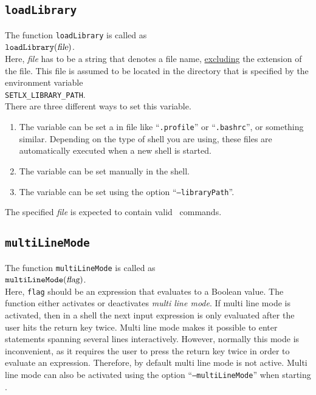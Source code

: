 \subsection{\texttt{loadLibrary}}
The function \texttt{loadLibrary}  is called as
\\[0.2cm]
\hspace*{1.3cm}
$\mathtt{loadLibrary}(\textsl{file})$.
\\[0.2cm]
Here, \textsl{file} has to be a string that denotes a file name, \underline{excludin}g the extension
of the file.  This file is assumed to be located in the directory that is specified by the
environment variable 
\\[0.2cm]
\hspace*{1.3cm}
\texttt{SETLX\_LIBRARY\_PATH}.
\\[0.2cm]
There are three different ways to set this variable.
\begin{enumerate}
\item The variable can be  set a in file like ``\texttt{.profile}'' or
      ``\texttt{.bashrc}'', or something similar.  Depending on the type of shell you are
      using, these files are automatically executed when a new shell is started.
\item The variable can be set manually in the shell.
\item The variable can be set using the option ``\texttt{--libraryPath}''.
\end{enumerate}
The specified \textsl{file} is expected to contain valid \setlx\ commands.

\subsection{\texttt{multiLineMode}}
The function \texttt{multiLineMode}  is called as
\\[0.2cm]
\hspace*{1.3cm}
$\mathtt{multiLineMode}(\textsl{flag})$.
\\[0.2cm]
Here, \texttt{flag} should be an expression that evaluates to a  Boolean value.  The
function either activates or deactivates \emph{multi line mode}.  If multi line mode is
activated, then in a shell the next input expression is only evaluated after  the user
hits the return key twice.  Multi line mode makes it possible to enter statements spanning
several lines interactively.  However, normally this mode is inconvenient, as it requires
the user to press the return key twice in order to evaluate an expression.  Therefore, by
default multi line mode is not active.  Multi line mode can also be activated using the option 
``\texttt{--multiLineMode}'' when starting \setlx.

